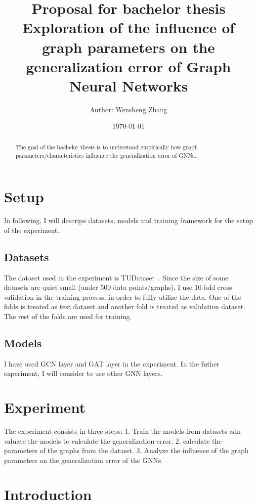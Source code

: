\documentclass{article}
\title{\textbf{Proposal for bachelor thesis}\\
Exploration of the influence of graph parameters on the generalization error of Graph Neural Networks}
\author{Author: Wensheng Zhang}
\date{\today}
\begin{document}
 

\maketitle

\tableofcontents


\begin{abstract}
The goal of the bachelor thesis is to understand empirically how graph parameters/characteristics influence the generalization error of GNNs. 
\end{abstract}


\section{Setup}

In following, I will descripe datasets, models and training framework for the setup of the experiment.

\subsection{Datasets}
The dataset used in the experiment is TUDataset~\cite{morris_tudataset_2020}. Since the size of some datasets are quiet small (under 500 data points/graphs), I use 10-fold cross validation in the training process, in order to fully utilize the data. One of the folds is treated as test dataset and another fold is treated as validation dataset. The rest of the folds are used for training. 

\subsection{Models}
I have used GCN layer and GAT layer in the experiment. In the futher experiment, I will consider to use other GNN layers.


\section{Experiment}
The experiment consists in three steps: 1. Train the models from datasets adn valuate the models to calculate the generalization error. 2. calculate the parameters of the graphs from the dataset. 3. Analyze the influence of the graph parameters on the generalization error of the GNNs.



\section{Introduction}
\blindtext
\end{document}
